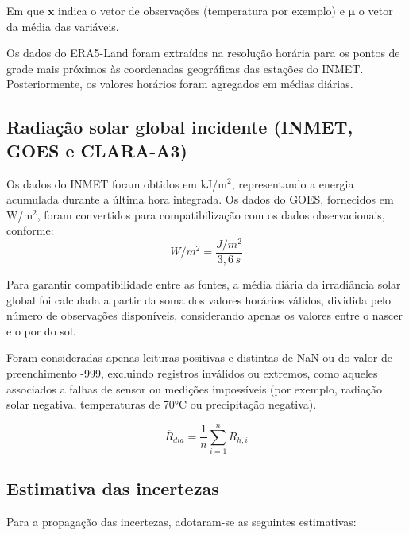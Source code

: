 Em que $\mathbf{x}$ indica o vetor de observações (temperatura por exemplo) e $\mathbf{\mu}$ o vetor da média das variáveis.

Os dados do ERA5-Land foram extraídos na resolução horária para os pontos de grade mais próximos às coordenadas geográficas das estações do INMET. Posteriormente, os valores horários foram agregados em médias diárias.

\subsection{Radiação solar global incidente (INMET, GOES e CLARA-A3)}

Os dados do INMET foram obtidos em kJ/m$^2$, representando a energia acumulada durante a última hora integrada. Os dados do GOES, fornecidos em W/m$^2$, foram convertidos para compatibilização com os dados observacionais, conforme:
\begin{equation}
W/m^2 = \frac{J/m^2}{3{,}6 \, s}
\end{equation}

Para garantir compatibilidade entre as fontes, a média diária da irradiância solar global foi calculada a partir da soma dos valores horários válidos, dividida pelo número de observações disponíveis, considerando apenas os valores entre o nascer e o por do sol. 

Foram consideradas apenas leituras positivas e distintas de NaN ou do valor de preenchimento -999, excluindo registros inválidos ou extremos, como aqueles associados a falhas de sensor ou medições impossíveis (por exemplo, radiação solar negativa, temperaturas de 70°C ou precipitação negativa).


\begin{equation}
\overline{R}_{dia} = \frac{1}{n}\sum_{i=1}^{n} R_{h,i}
\end{equation}

\subsection{Estimativa das incertezas}

Para a propagação das incertezas, adotaram-se as seguintes estimativas:

